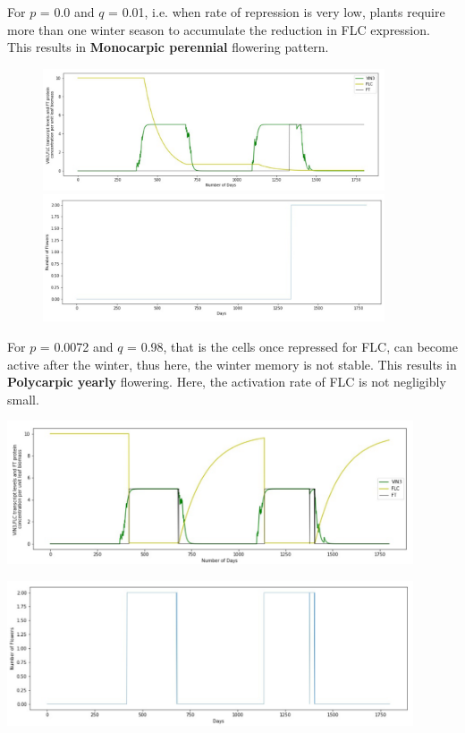 \documentclass[10 pt]{article}
\begin{document}
For $p$ = 0.0 and $q$ = 0.01, i.e. when rate of repression is very low, plants require more than one winter season to accumulate the reduction in FLC expression. This results in \textbf{Monocarpic perennial} flowering pattern.
\begin{figure}[h]
\includegraphics[width=0.9\textwidth]{perennial_vin-flc.png}
\includegraphics[width=0.9\textwidth]{perennial_flowering.png}
\end{figure}

For $p$ = 0.0072 and $q$ = 0.98, that is the cells once repressed for FLC, can become active after the winter, thus here, the winter memory is not stable. This results in \textbf{Polycarpic yearly} flowering. Here, the activation rate of FLC is not negligibly small. 

\includegraphics[width=0.9\textwidth]{perennial_poly_vin-flc.png}

\includegraphics[width=0.9\textwidth]{perennial_poly_flowering.png}
\end{document}
